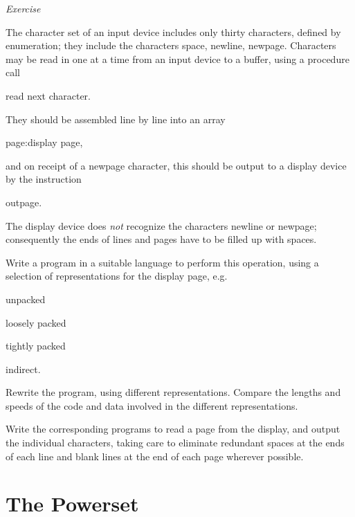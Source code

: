\noindent
\textit{Exercise}
\nopagebreak

\noindent
The character set of an input device includes only thirty characters, defined by enumeration; they include the characters space, newline, newpage. Characters may be read in one at a time from an input device to a buffer, using a procedure call

\quad read next character.

\noindent
They should be assembled line by line into an array

\quad page:display page,

\noindent
and on receipt of a newpage character, this should be output to a display device by the instruction

\quad outpage.

\noindent
The display device does \textit{not} recognize the characters newline or newpage; consequently the ends of lines and pages have to be filled up with spaces.

Write a program in a suitable language to perform this operation, using a selection of representations for the display page, e.g.

\quad unpacked

\quad loosely packed

\quad tightly packed

\quad indirect.

\noindent
Rewrite the program, using different representations. Compare the lengths and speeds of the code and data involved in the different representations.

Write the corresponding programs to read a page from the display, and output the individual characters, taking care to eliminate redundant spaces at the ends of each line and blank lines at the end of each page wherever possible.

\section[The powerset]{The Powerset}

